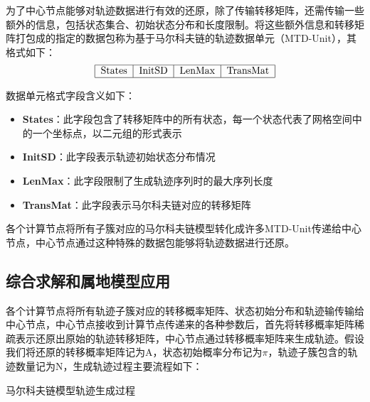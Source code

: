 
为了中心节点能够对轨迹数据进行有效的还原，除了传输转移矩阵，还需传输一些额外的信息，包括状态集合、初始状态分布和长度限制。将这些额外信息和转移矩阵打包成的指定的数据包称为基于马尔科夫链的轨迹数据单元（MTD-Unit），其格式如下：\\
$$
\begin{tabular}{|c|c|c|c|}
\hline States&InitSD&LenMax&TransMat\\
\hline
\end{tabular}
$$

数据单元格式字段含义如下：
\begin{itemize}
\item \textbf{States}：此字段包含了转移矩阵中的所有状态，每一个状态代表了网格空间中的一个坐标点，以二元组的形式表示
\item \textbf{InitSD}：此字段表示轨迹初始状态分布情况
\item \textbf{LenMax}：此字段限制了生成轨迹序列时的最大序列长度
\item \textbf{TransMat}：此字段表示马尔科夫链对应的转移矩阵
\end{itemize}

各个计算节点将所有子簇对应的马尔科夫链模型转化成许多MTD-Unit传递给中心节点，中心节点通过这种特殊的数据包能够将轨迹数据进行还原。


\subsection{综合求解和属地模型应用}
各个计算节点将所有轨迹子簇对应的转移概率矩阵、状态初始分布和轨迹输传输给中心节点，中心节点接收到计算节点传递来的各种参数后，首先将转移概率矩阵稀疏表示还原出原始的轨迹转移矩阵，中心节点通过转移概率矩阵来生成轨迹。假设我们将还原的转移概率矩阵记为A，状态初始概率分布记为$\pi$，轨迹子簇包含的轨迹数量记为N，生成轨迹过程主要流程如下：\\
\begin{algorithm}[H]
	 \caption{马尔科夫链模型轨迹生成过程}
\end{algorithm}


